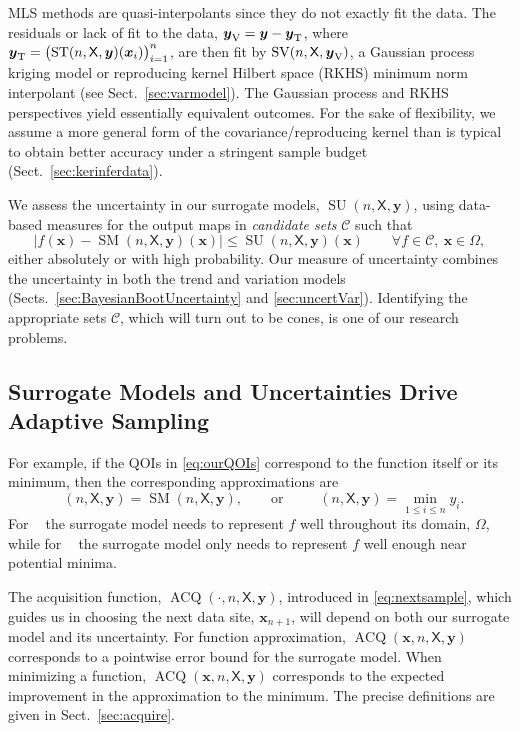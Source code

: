 \documentclass[11pt]{NSFamsart}
\DeclareMathOperator{\SURR}{SM} %
\DeclareMathOperator{\STREND}{ST} %
\DeclareMathOperator{\SVAR}{SV} %
\newcommand{\MLS}{\textrm{MLS}\xspace} %
\DeclareMathOperator{\VAL}{ACQ}
\DeclareMathOperator{\MIN}{MIN}
\DeclareMathOperator{\ID}{ID}
\DeclareMathOperator{\APPMIN}{\widehat{\MIN}}
\DeclareMathOperator{\APPID}{\widehat{\ID}}
\DeclareMathOperator{\SURRERR}{SU}
\newcommand{\TREND}{\textup{T}}
\newcommand{\VAR}{\textup{V}}
\newcommand{\mX}{\mathsf{X}}
\newcommand{\bx}{{\boldsymbol{x}}}
\newcommand{\by}{{\boldsymbol{y}}}
\newcommand{\calc}{{\mathcal{C}}}
\def\abs#1{\ensuremath{\left \lvert #1 \right \rvert}}
\begin{document}
\MLS methods are quasi-interpolants since they do not exactly fit the data. 
The residuals or lack of fit to the data, $\by_{\VAR} = \by - \by_{\TREND}$, where $\by_{\TREND} = \bigl( \STREND(n,\mX,\by)(\bx_i) \bigr)_{i=1}^n$, are then  fit by $\SVAR(n,\mX,\by_{\VAR})$, a Gaussian process kriging model or reproducing kernel Hilbert space (RKHS) minimum norm interpolant (see Sect.\ \ref{sec:varmodel}). The Gaussian process and RKHS perspectives yield essentially equivalent outcomes. For the sake of flexibility, we assume a more general form of the covariance/reproducing kernel than is typical to obtain better accuracy under a stringent sample budget (Sect.\ \ref{sec:kerinferdata}). 

We assess the uncertainty in our surrogate models, $\SURRERR(n,\mX,\by)$, using data-based measures for the output maps in \emph{candidate sets} $\calc$ such that 
\begin{equation} \label{eq:surrUncert}
\abs{f(\bx)-\SURR(n,\mX,\by)(\bx)} \le \SURRERR(n,\mX,\by)(\bx) \qquad \forall f \in \calc,\ \bx \in \Omega,
\end{equation} 
either absolutely or with high probability. Our measure of uncertainty combines the uncertainty in both the trend and variation models (Sects.\ \ref{sec:BayesianBootUncertainty} and \ref{sec:uncertVar}). Identifying the appropriate sets $\calc$, which will turn out to be cones, is one of our research problems.

\subsection{Surrogate Models and Uncertainties Drive Adaptive Sampling} 
For example, if the QOIs in \eqref{eq:ourQOIs} correspond to the function itself or its minimum, then the corresponding approximations are
\begin{equation} \label{eq:QOIhat}
\APPID(n,\mX,\by) = \SURR(n,\mX,\by), \qquad \text{or}\qquad \APPMIN(n,\mX,\by) = \min_{1 \le i \le n} y_i.
\end{equation}
For $\APPID$ the surrogate model needs to represent $f$ well throughout its domain, $\Omega$, while for $\APPMIN$ the surrogate model only needs to represent $f$ well enough near potential minima.

The acquisition function, $\VAL(\cdot,n,\mX, \by)$, introduced in \eqref{eq:nextsample}, which guides us in choosing the next data site, $\bx_{n+1}$, will depend on both our surrogate model and its uncertainty. For function approximation, $\VAL(\bx,n,\mX, \by)$ corresponds to a pointwise error bound for the surrogate model. When minimizing a function, $\VAL(\bx,n,\mX, \by)$ corresponds to the expected improvement in the approximation to the minimum. The precise definitions are given in Sect.\ \ref{sec:acquire}.
\end{document}
